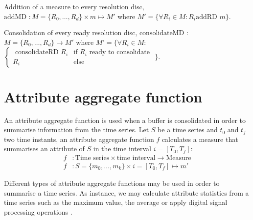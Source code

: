 

Addition of a measure to every
resolution disc, $\text{addMD } : M=\{R_0,\dotsc,R_d\} \times m
\mapsto M' $ where $M'= \{ \forall R_i\in M: R_i \text{
  addRD } m \}$.


Consolidation of every ready resolution disc, \linebreak[4]
 $\text{consolidateMD } :$
$M=\{R_0,\dotsc,R_d\} \mapsto M'$ where $ M'= \big\{ \forall R_i\in M:$ \\
  $\begin{cases}
    \text{ consolidateRD } R_i & \text{if } R_i \text{ ready to consolidate} \\
    R_i & \text{else }
  \end{cases}$ $\big\}
  $.








\section{Attribute aggregate function}
\label{sec:model:interpolador}


An attribute aggregate function is used when a buffer is
consolidated in order to summarise information from the time series.
Let $S$ be a time series and $t_0$ and $t_f$ two time instants, an
attribute aggregate function $f$ calculates a measure that
summarises an attribute of $S$ in the time interval $i=[T_0,T_f]$:
\begin{align*}
f&: \text{Time series} \times \text{time interval} \longrightarrow
\text{Measure} \\
f&: S=\{m_0,\ldots,m_k\} \times i=[T_0,T_f] \mapsto m'
\end{align*}

Different types of attribute aggregate functions may be used in order
to summarise a time series. As instance, we may calculate attribute
statistics from a time series such as the maximum value, the average
or apply digital signal processing operations \cite{zhang11}.

